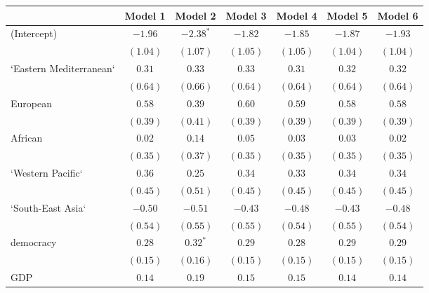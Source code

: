 
\begin{table}[!h]
\begin{center}
\begin{tabular}{l c c c c c c }
\toprule
 & Model 1 & Model 2 & Model 3 & Model 4 & Model 5 & Model 6 \\
\midrule
(Intercept)             & $-1.96$      & $-2.38^{*}$  & $-1.82$      & $-1.85$      & $-1.87$      & $-1.93$      \\
                        & $(1.04)$     & $(1.07)$     & $(1.05)$     & $(1.05)$     & $(1.04)$     & $(1.04)$     \\
`Eastern Mediterranean` & $0.31$       & $0.33$       & $0.33$       & $0.31$       & $0.32$       & $0.32$       \\
                        & $(0.64)$     & $(0.66)$     & $(0.64)$     & $(0.64)$     & $(0.64)$     & $(0.64)$     \\
European                & $0.58$       & $0.39$       & $0.60$       & $0.59$       & $0.58$       & $0.58$       \\
                        & $(0.39)$     & $(0.41)$     & $(0.39)$     & $(0.39)$     & $(0.39)$     & $(0.39)$     \\
African                 & $0.02$       & $0.14$       & $0.05$       & $0.03$       & $0.03$       & $0.02$       \\
                        & $(0.35)$     & $(0.37)$     & $(0.35)$     & $(0.35)$     & $(0.35)$     & $(0.35)$     \\
`Western Pacific`       & $0.36$       & $0.25$       & $0.34$       & $0.33$       & $0.34$       & $0.34$       \\
                        & $(0.45)$     & $(0.51)$     & $(0.45)$     & $(0.45)$     & $(0.45)$     & $(0.45)$     \\
`South-East Asia`       & $-0.50$      & $-0.51$      & $-0.43$      & $-0.48$      & $-0.43$      & $-0.48$      \\
                        & $(0.54)$     & $(0.55)$     & $(0.55)$     & $(0.54)$     & $(0.55)$     & $(0.54)$     \\
democracy               & $0.28$       & $0.32^{*}$   & $0.29$       & $0.28$       & $0.29$       & $0.29$       \\
                        & $(0.15)$     & $(0.16)$     & $(0.15)$     & $(0.15)$     & $(0.15)$     & $(0.15)$     \\
GDP                     & $0.14$       & $0.19$       & $0.15$       & $0.15$       & $0.14$       & $0.14$       \\

\end{tabular}
\end{center}
\end{table}
